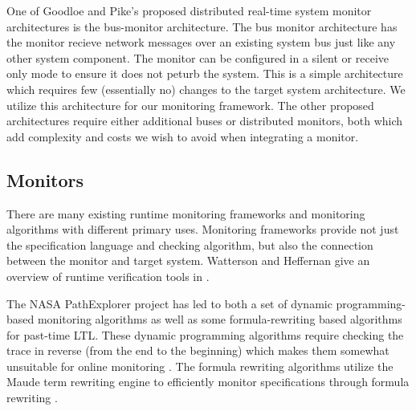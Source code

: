 \documentclass[]{../llncs/llncs}
\begin{document}
One of Goodloe and Pike's proposed distributed real-time system monitor architectures is the bus-monitor architecture.
The bus monitor architecture has the monitor recieve network messages over an existing system bus just like any other system component. 
The monitor can be configured in a silent or receive only mode to ensure it does not peturb the system. 
This is a simple architecture which requires few (essentially no) changes to the target system architecture. We utilize this architecture for our monitoring framework. The other proposed architectures require either additional buses or distributed monitors, both which add complexity and costs we wish to avoid when integrating a monitor. %

\subsection{Monitors}
There are many existing runtime monitoring frameworks and monitoring algorithms with different primary uses. Monitoring frameworks provide not just the specification language and checking algorithm, but also the connection between the monitor and target system.
Watterson and Heffernan give an overview of runtime verification tools in \cite{Watterson2007}. 

The NASA PathExplorer project has led to both a set of dynamic programming-based monitoring algorithms as well as some formula-rewriting based algorithms \cite{Havelund2004} for past-time LTL. These dynamic programming algorithms require checking the trace in reverse (from the end to the beginning) which makes them somewhat unsuitable for online monitoring \cite{Havelund2002}. The formula rewriting algorithms utilize the Maude term rewriting engine to efficiently monitor specifications through formula rewriting \cite{Rosu2005}. 
\end{document}
